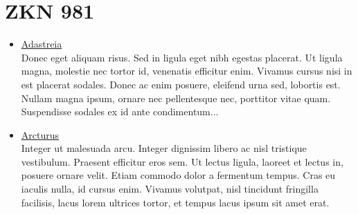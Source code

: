 \chapter{ZKN 981}
\label{appendix:zkn-981}

\begin{itemize}
	\item \href{https://en.wikipedia.org/wiki/Lorem_ipsum}{Adastreia}\\
	
	Donec eget aliquam risus. Sed in ligula eget nibh egestas placerat. Ut ligula magna, molestie nec tortor id, venenatis efficitur enim. Vivamus cursus nisi in est placerat sodales. Donec ac enim posuere, eleifend urna sed, lobortis est. Nullam magna ipsum, ornare nec pellentesque nec, porttitor vitae quam. Suspendisse sodales ex id ante condimentum...
	
	\item \href{https://en.wikipedia.org/wiki/Lorem_ipsum}{Arcturus}\\
	
	Integer ut malesuada arcu. Integer dignissim libero ac nisl tristique vestibulum. Praesent efficitur eros sem. Ut lectus ligula, laoreet et lectus in, posuere ornare velit. Etiam commodo dolor a fermentum tempus. Cras eu iaculis nulla, id cursus enim. Vivamus volutpat, nisl tincidunt fringilla facilisis, lacus lorem ultrices tortor, et tempus lacus ipsum sit amet erat.
	
\end{itemize}